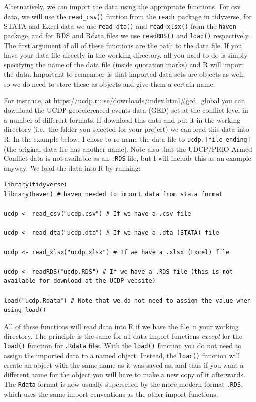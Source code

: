 \documentclass[
]{book}
\begin{document}
Alternatively, we can import the data using the appropriate functions. For csv data, we will use the \texttt{read\_csv()} funtion from the \texttt{readr} package in tidyverse, for STATA and Excel data we use \texttt{read\_dta()} and \texttt{read\_xlsx()} from the \texttt{haven} package, and for RDS and Rdata files we use \texttt{readRDS()} and \texttt{load()} respectively. The first argument of all of these functions are the path to the data file. If you have your data file directly in the working directory, all you need to do is simply specifying the name of the data file (inside quotation marks) and R will import the data. Important to remember is that imported data sets are objects as well, so we do need to store these as objects and give them a certain name.

For instance, at \url{https://ucdp.uu.se/downloads/index.html\#ged_global} you can download the UCDP georeferenced events data (GED) set at the conflict level in a number of different formats. If download this data and put it in the working directory (i.e.~the folder you selected for your project) we can load this data into R. In the example below, I chose to re-name the data file to \texttt{ucdp.{[}file\_ending{]}} (the original data file has another name). Note also that the UDCP/PRIO Armed Conflict data is not available as an \texttt{.RDS} file, but I will include this as an example anyway. We load the data into R by running:

\begin{verbatim}
library(tidyverse)
library(haven) # haven needed to import data from stata format

ucdp <- read_csv("ucdp.csv") # If we have a .csv file

ucdp <- read_dta("ucdp.dta") # If we have a .dta (STATA) file

ucdp <- read_xlsx("ucdp.xlsx") # If we have a .xlsx (Excel) file

ucdp <- readRDS("ucdp.RDS") # If we have a .RDS file (this is not available for download at the UCDP website)

load("ucdp.Rdata") # Note that we do not need to assign the value when using load()
\end{verbatim}

All of these functions will read data into R if we have the file in your working directory. The principle is the same for all data import functions \emph{except} for the \texttt{load()} function for \texttt{.Rdata} files. With the \texttt{load()} function you do not need to assign the imported data to a named object. Instead, the \texttt{load()} function will create an object with the same name as it was saved as, and thus if you want a different name for the object you will have to make a new copy of it afterwards. The \texttt{Rdata} format is now usually superseded by the more modern format \texttt{.RDS}, which uses the same import conventions as the other import functions.
\end{document}
